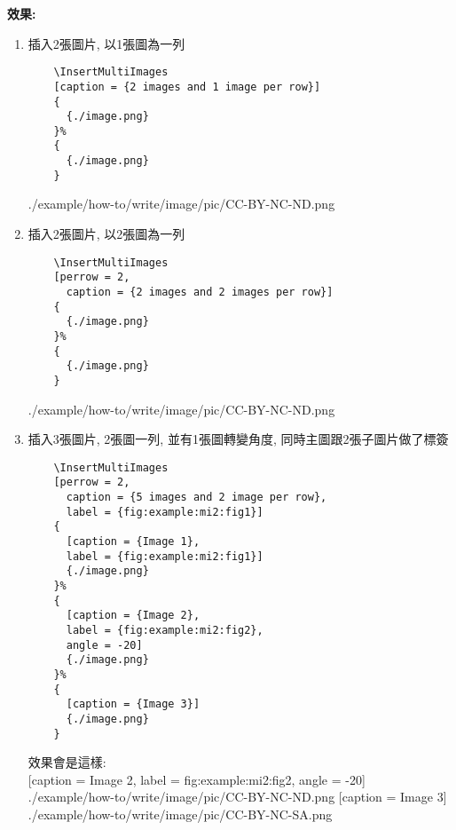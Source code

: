   \newpage

  {\bf 效果:}
  \begin{enumerate}
  \item
  {
    插入2張圖片, 以1張圖為一列
    \begin{verbatim}
    \InsertMultiImages
    [caption = {2 images and 1 image per row}]
    {
      {./image.png}
    }%
    {
      {./image.png}
    }
    \end{verbatim}
    {
      {./example/how-to/write/image/pic/CC-BY-NC-ND.png}
    }
  } %

  \item
  {
    插入2張圖片, 以2張圖為一列
    \begin{verbatim}
    \InsertMultiImages
    [perrow = 2,
      caption = {2 images and 2 images per row}]
    {
      {./image.png}
    }%
    {
      {./image.png}
    }
    \end{verbatim}
    {
      {./example/how-to/write/image/pic/CC-BY-NC-ND.png}
    }
  } %

  \newpage
  \item
  {
    插入3張圖片, 2張圖一列, 並有1張圖轉變角度, 同時主圖跟2張子圖片做了標簽
    \begin{verbatim}
    \InsertMultiImages
    [perrow = 2,
      caption = {5 images and 2 image per row},
      label = {fig:example:mi2:fig1}]
    {
      [caption = {Image 1},
      label = {fig:example:mi2:fig1}]
      {./image.png}
    }%
    {
      [caption = {Image 2},
      label = {fig:example:mi2:fig2},
      angle = -20]
      {./image.png}
    }%
    {
      [caption = {Image 3}]
      {./image.png}
    }
    \end{verbatim}

    效果會是這樣: \\
    {
      [caption = {Image 2},
      label = {fig:example:mi2:fig2},
      angle = -20]
      {./example/how-to/write/image/pic/CC-BY-NC-ND.png}
    }%
    {
      [caption = {Image 3}]
      {./example/how-to/write/image/pic/CC-BY-NC-SA.png}
    }

}
\end{enumerate}
